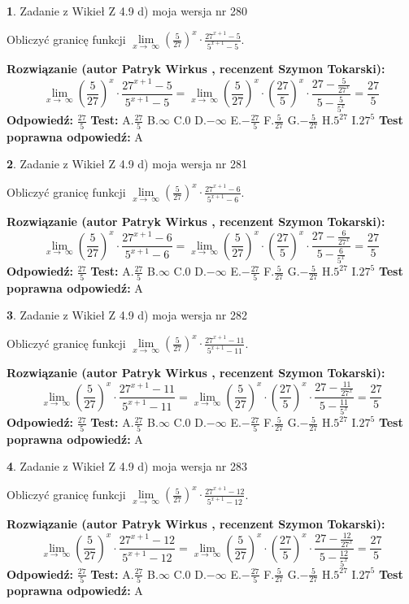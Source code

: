 \documentclass[12pt, a4paper]{article}
\theoremstyle{definition} %
\newtheorem{zad}{}
\newcommand{\zadStart}[1]{\begin{zad}#1\newline}
\newcommand{\zadStop}{\end{zad}}
\newcommand{\rozwStart}[2]{\noindent \textbf{Rozwiązanie (autor #1 , recenzent #2): }\newline}
\newcommand{\rozwStop}{\newline}
\newcommand{\odpStart}{\noindent \textbf{Odpowiedź:}\newline}
\newcommand{\odpStop}{\newline}
\newcommand{\testStart}{\noindent \textbf{Test:}\newline}
\newcommand{\testStop}{\newline}
\newcommand{\kluczStart}{\noindent \textbf{Test poprawna odpowiedź:}\newline}
\newcommand{\kluczStop}{\newline}
\begin{document}
\zadStart{Zadanie z Wikieł Z 4.9 d) moja wersja nr 280}


Obliczyć granicę funkcji  $\lim\limits_{x\to\ \infty}(\frac{5}{27})^{x}\cdot\frac{27^{x+1}-5}{5^{x+1}-5}$.
\zadStop
\rozwStart{Patryk Wirkus}{Szymon Tokarski}
$$\lim\limits_{x\to\ \infty}(\frac{5}{27})^{x}\cdot\frac{27^{x+1}-5}{5^{x+1}-5}=\lim\limits_{x\to\ \infty}(\frac{5}{27})^{x}\cdot(\frac{27}{5})^{x} \cdot \frac{27-\frac{5}{27^{x}}}{5-\frac{5}{5^{x}}} = \frac{27}{5}$$
\rozwStop
\odpStart
$\frac{27}{5}$
\odpStop
\testStart
A.$\frac{27}{5}$ B.$\infty$ C.$0$ D.$-\infty$ E.$-\frac{27}{5}$
F.$\frac{5}{27}$ G.$-\frac{5}{27}$
H.$5^{27}$
I.$27^{5}$
\testStop
\kluczStart
A
\kluczStop



\zadStart{Zadanie z Wikieł Z 4.9 d) moja wersja nr 281}


Obliczyć granicę funkcji  $\lim\limits_{x\to\ \infty}(\frac{5}{27})^{x}\cdot\frac{27^{x+1}-6}{5^{x+1}-6}$.
\zadStop
\rozwStart{Patryk Wirkus}{Szymon Tokarski}
$$\lim\limits_{x\to\ \infty}(\frac{5}{27})^{x}\cdot\frac{27^{x+1}-6}{5^{x+1}-6}=\lim\limits_{x\to\ \infty}(\frac{5}{27})^{x}\cdot(\frac{27}{5})^{x} \cdot \frac{27-\frac{6}{27^{x}}}{5-\frac{6}{5^{x}}} = \frac{27}{5}$$
\rozwStop
\odpStart
$\frac{27}{5}$
\odpStop
\testStart
A.$\frac{27}{5}$ B.$\infty$ C.$0$ D.$-\infty$ E.$-\frac{27}{5}$
F.$\frac{5}{27}$ G.$-\frac{5}{27}$
H.$5^{27}$
I.$27^{5}$
\testStop
\kluczStart
A
\kluczStop



\zadStart{Zadanie z Wikieł Z 4.9 d) moja wersja nr 282}


Obliczyć granicę funkcji  $\lim\limits_{x\to\ \infty}(\frac{5}{27})^{x}\cdot\frac{27^{x+1}-11}{5^{x+1}-11}$.
\zadStop
\rozwStart{Patryk Wirkus}{Szymon Tokarski}
$$\lim\limits_{x\to\ \infty}(\frac{5}{27})^{x}\cdot\frac{27^{x+1}-11}{5^{x+1}-11}=\lim\limits_{x\to\ \infty}(\frac{5}{27})^{x}\cdot(\frac{27}{5})^{x} \cdot \frac{27-\frac{11}{27^{x}}}{5-\frac{11}{5^{x}}} = \frac{27}{5}$$
\rozwStop
\odpStart
$\frac{27}{5}$
\odpStop
\testStart
A.$\frac{27}{5}$ B.$\infty$ C.$0$ D.$-\infty$ E.$-\frac{27}{5}$
F.$\frac{5}{27}$ G.$-\frac{5}{27}$
H.$5^{27}$
I.$27^{5}$
\testStop
\kluczStart
A
\kluczStop



\zadStart{Zadanie z Wikieł Z 4.9 d) moja wersja nr 283}


Obliczyć granicę funkcji  $\lim\limits_{x\to\ \infty}(\frac{5}{27})^{x}\cdot\frac{27^{x+1}-12}{5^{x+1}-12}$.
\zadStop
\rozwStart{Patryk Wirkus}{Szymon Tokarski}
$$\lim\limits_{x\to\ \infty}(\frac{5}{27})^{x}\cdot\frac{27^{x+1}-12}{5^{x+1}-12}=\lim\limits_{x\to\ \infty}(\frac{5}{27})^{x}\cdot(\frac{27}{5})^{x} \cdot \frac{27-\frac{12}{27^{x}}}{5-\frac{12}{5^{x}}} = \frac{27}{5}$$
\rozwStop
\odpStart
$\frac{27}{5}$
\odpStop
\testStart
A.$\frac{27}{5}$ B.$\infty$ C.$0$ D.$-\infty$ E.$-\frac{27}{5}$
F.$\frac{5}{27}$ G.$-\frac{5}{27}$
H.$5^{27}$
I.$27^{5}$
\testStop
\kluczStart
A
\kluczStop
\end{document}
